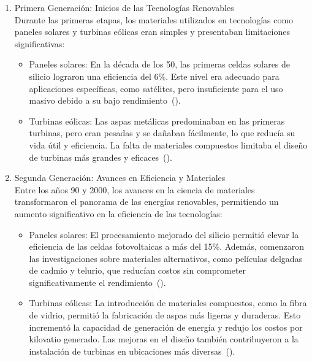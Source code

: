 \documentclass[letterpaper, 12pt]{article}
\begin{document}
\begin{enumerate}
      \item Primera Generación: Inicios de las Tecnologías Renovables \\ Durante las
            primeras etapas, los materiales utilizados en tecnologías como paneles solares
            y turbinas eólicas eran simples y presentaban limitaciones significativas:

            \begin{itemize}
                  \item Paneles solares: En la década de los 50, las primeras celdas solares de silicio
                        lograron una eficiencia del 6\%. Este nivel era adecuado para aplicaciones
                        específicas, como satélites, pero insuficiente para el uso masivo debido a su
                        bajo rendimiento~(\cite{Galembeck2019}).
                  \item Turbinas eólicas: Las aspas metálicas predominaban en las primeras turbinas,
                        pero eran pesadas y se dañaban fácilmente, lo que reducía su vida útil y
                        eficiencia. La falta de materiales compuestos limitaba el diseño de turbinas
                        más grandes y eficaces~(\cite{Leader_Gaustad2019a}).
            \end{itemize}

      \item Segunda Generación: Avances en Eficiencia y Materiales \\ Entre los años 90 y
            2000, los avances en la ciencia de materiales transformaron el panorama de las
            energías renovables, permitiendo un aumento significativo en la eficiencia de
            las tecnologías:

            \begin{itemize}
                  \item Paneles solares: El procesamiento mejorado del silicio permitió elevar la
                        eficiencia de las celdas fotovoltaicas a más del 15\%. Además, comenzaron las
                        investigaciones sobre materiales alternativos, como películas delgadas de
                        cadmio y telurio, que reducían costos sin comprometer significativamente el
                        rendimiento~(\cite{Henriksson2021}).

                  \item Turbinas eólicas: La introducción de materiales compuestos, como la fibra de
                        vidrio, permitió la fabricación de aspas más ligeras y duraderas. Esto
                        incrementó la capacidad de generación de energía y redujo los costos por
                        kilovatio generado. Las mejoras en el diseño también contribuyeron a la
                        instalación de turbinas en ubicaciones más diversas~(\cite{Ebhota_Jen2019}).
            \end{itemize}


\end{enumerate}
\end{document}
